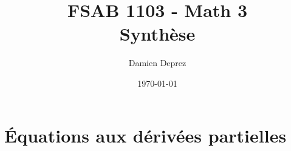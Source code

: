 \documentclass[12pt,a4paper,twoside]{report}
\begin{document}
\makeatletter

\author{Damien Deprez}
\title{FSAB 1103 - Math 3\\Synthèse}
\date{\today}
\titre{\@title}{\@author}{\@date}{}{}

\tableofcontents
\chapter{Équations aux dérivées partielles}
\end{document}
